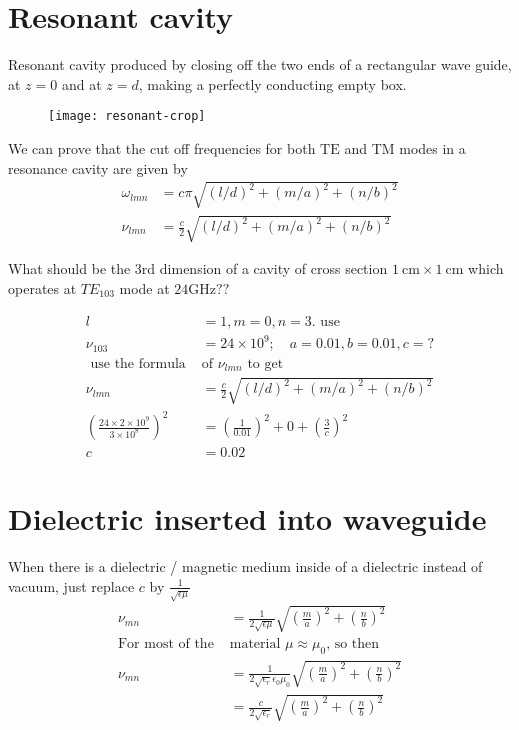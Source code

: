 \section{Resonant cavity}
Resonant cavity produced by closing off the two ends of a rectangular wave guide, at $z=0$ and at $z=d$, making a perfectly conducting empty box.\\
\begin{figure}[H]
	\centering
	\texttt{[image: resonant-crop]}
	\caption{}
	\label{}
\end{figure}
We can prove that the cut off frequencies for both $\mathrm{TE}$ and TM modes in a resonance cavity are given by
\begin{align*}
\omega_{l m n}&=c \pi \sqrt{(l / d)^{2}+(m / a)^{2}+(n / b)^{2}} \\
\nu_{l m n}&=\frac{c}{2} \sqrt{(l / d)^{2}+(m / a)^{2}+(n / b)^{2}}
\end{align*}
\begin{exercise}
	 What should be the 3rd dimension of a cavity of cross section $1 \mathrm{~cm} \times 1 \mathrm{~cm}$ which operates at $T E_{103}$ mode at $24 \mathrm{GHz} ? ?$
\end{exercise}
\begin{answer}
	\begin{align*}
 l&=1, m=0, n=3\text{. use}\\
	\nu_{103}&=24 \times 10^{9} ; \quad a=0.01, b=0.01, c=?\\
\text{	use the formula }&\text{of $\nu_{l m n}$ to get}\\
	\nu_{l m n}&=\frac{c}{2} \sqrt{(l / d)^{2}+(m / a)^{2}+(n / b)^{2}}\\
	\left(\frac{24 \times 2 \times 10^{9}}{3 \times 10^{8}}\right)^{2}&=\left(\frac{1}{0.01}\right)^{2}+0+\left(\frac{3}{c}\right)^{2}\\
	c&=0.02	
	\end{align*}
\end{answer}
\section{ Dielectric inserted into waveguide}
When there is a dielectric / magnetic medium inside of a dielectric instead of vacuum, just replace $c$ by $\frac{1}{\sqrt{\epsilon \mu}}$
\begin{align*}
\nu_{m n}&=\frac{1}{2 \sqrt{\epsilon \mu}} \sqrt{\left(\frac{m}{a}\right)^{2}+\left(\frac{n}{b}\right)^{2}}\\
\text{For most of the }&\text{material }\mu \approx \mu_{0}\text{, so then}\\
\nu_{m n} &=\frac{1}{2 \sqrt{\epsilon_{r}} \epsilon_{0} \mu_{0}} \sqrt{\left(\frac{m}{a}\right)^{2}+\left(\frac{n}{b}\right)^{2}} \\
&=\frac{c}{2 \sqrt{\epsilon_{r}}} \sqrt{\left(\frac{m}{a}\right)^{2}+\left(\frac{n}{b}\right)^{2}}
\end{align*}

